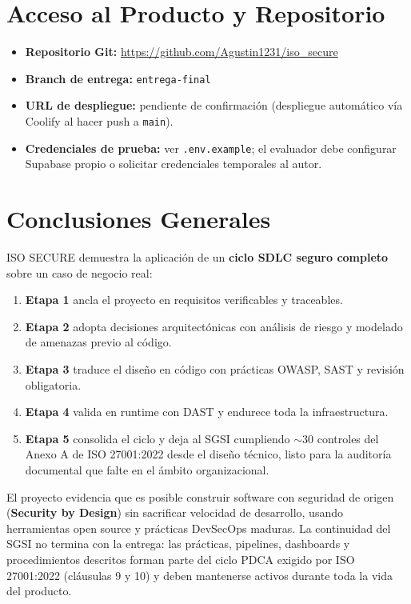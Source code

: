 \documentclass[12pt,a4paper,oneside]{article}
\begin{document}
\section{Acceso al Producto y Repositorio}

\begin{itemize}[leftmargin=*]
  \item \textbf{Repositorio Git:} \url{https://github.com/Agustin1231/iso_secure}
  \item \textbf{Branch de entrega:} \texttt{entrega-final}
  \item \textbf{URL de despliegue:} pendiente de confirmación (despliegue automático vía Coolify al hacer push a \texttt{main}).
  \item \textbf{Credenciales de prueba:} ver \texttt{.env.example}; el evaluador debe configurar Supabase propio o solicitar credenciales temporales al autor.
\end{itemize}

\section{Conclusiones Generales}

ISO SECURE demuestra la aplicación de un \textbf{ciclo SDLC seguro completo} sobre un caso de negocio real:

\begin{enumerate}[leftmargin=*]
  \item \textbf{Etapa 1} ancla el proyecto en requisitos verificables y traceables.
  \item \textbf{Etapa 2} adopta decisiones arquitectónicas con análisis de riesgo y modelado de amenazas previo al código.
  \item \textbf{Etapa 3} traduce el diseño en código con prácticas OWASP, SAST y revisión obligatoria.
  \item \textbf{Etapa 4} valida en runtime con DAST y endurece toda la infraestructura.
  \item \textbf{Etapa 5} consolida el ciclo y deja al SGSI cumpliendo $\sim$30 controles del Anexo A de ISO 27001:2022 desde el diseño técnico, listo para la auditoría documental que falte en el ámbito organizacional.
\end{enumerate}

El proyecto evidencia que es posible construir software con seguridad de origen (\textbf{Security by Design}) sin sacrificar velocidad de desarrollo, usando herramientas open source y prácticas DevSecOps maduras. La continuidad del SGSI no termina con la entrega: las prácticas, pipelines, dashboards y procedimientos descritos forman parte del ciclo PDCA exigido por ISO 27001:2022 (cláusulas 9 y 10) y deben mantenerse activos durante toda la vida del producto.
\end{document}
